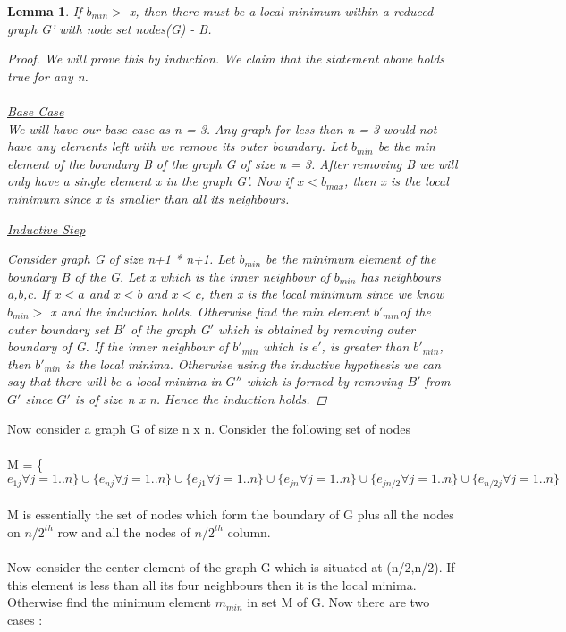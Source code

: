 \documentclass[12pt]{article}
\newtheorem{lemma}[theorem]{Lemma}
\begin{document}
\begin{lemma} If $b_{min} > $  x, then there must be a local minimum within a reduced graph G' with node set nodes(G) - B.
\begin{proof}
We will prove this by induction. We claim that the statement above holds true for any n.
\\\\
\underline{Base Case}\\
We will have our base case as n = 3. Any graph for less than n = 3 would not have any elements left with we remove its outer boundary.
Let $b_{min}$ be the min element of the boundary B of the graph G of size n = 3. After removing B we will only have a single element x in the graph G'. Now if $x < b_{max}$, then x is the local minimum since x is smaller than all its neighbours.


\underline{Inductive Step} 

Consider graph G of size n+1 * n+1. Let $b_{min}$ be the minimum element of the boundary B of the G. Let x which is the inner neighbour of $b_{min}$ has neighbours a,b,c. If $x < a$ and $x < b$ and $x < c$, then x is the local minimum since we know $b_{min} > $  x and the induction holds. Otherwise find the min element $b'_{min}$of the outer boundary set B$'$ of the graph G$'$ which is obtained by removing outer boundary of G. If the inner neighbour of $b'_{min}$ which is $e'$, is greater than $b'_{min}$, then $b'_{min}$ is the local minima. Otherwise using the inductive hypothesis we can say that there will be a local minima in $G''$ which is formed by removing $B'$ from $G'$ since $G'$ is of size n x n. Hence the induction holds.
\end{proof}
\end{lemma}
Now consider a graph G of size n x n. Consider the following set of nodes
\\\\
M = { \{$e_{1j} \forall j=1..n\} \cup \{e_{nj} \forall j=1..n\} \cup \{e_{j1} \forall j=1..n\}\cup \{e_{jn} \forall j=1..n\} \cup \{e_{jn/2} \forall j=1..n\} \cup \{e_{n/2j} \forall j=1..n\}$ }
\\\\
M is essentially the set of nodes which form the boundary of G plus all the nodes on $n/2^{th}$ row and all the nodes of $n/2^{th}$ column.
\\\\
Now consider the center element of the graph G which is situated at (n/2,n/2). If this element is less than all its four neighbours then it is the local minima. Otherwise find the minimum element $m_{min}$ in set M of G. Now there are two cases : 
\end{document}
